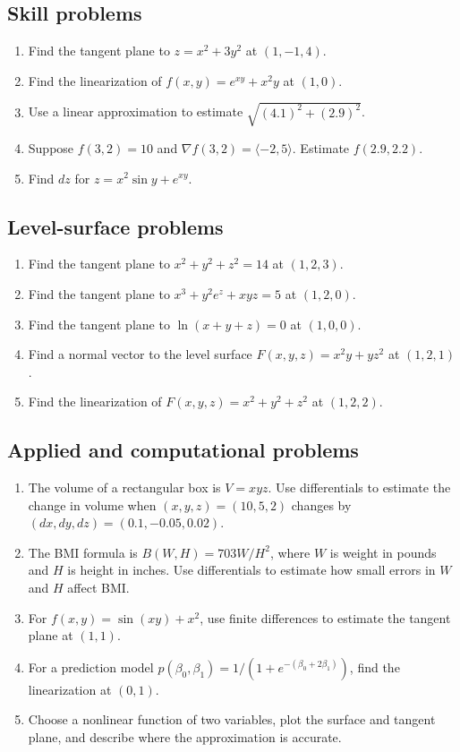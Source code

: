 \documentclass[11pt]{article}
\newcommand{\grad}{\nabla}
\begin{document}
\subsection*{Skill problems}
\begin{enumerate}[start=6]
  \item Find the tangent plane to $z=x^2+3y^2$ at $(1,-1,4)$.
  \item Find the linearization of $f(x,y)=e^{xy}+x^2y$ at $(1,0)$.
  \item Use a linear approximation to estimate $\sqrt{(4.1)^2+(2.9)^2}$.
  \item Suppose $f(3,2)=10$ and $\grad f(3,2)=\langle -2,5\rangle$. Estimate $f(2.9,2.2)$.
  \item Find $dz$ for $z=x^2\sin y+e^{xy}$.
\end{enumerate}

\subsection*{Level-surface problems}
\begin{enumerate}[start=11]
  \item Find the tangent plane to $x^2+y^2+z^2=14$ at $(1,2,3)$.
  \item Find the tangent plane to $x^3+y^2e^z+xyz=5$ at $(1,2,0)$.
  \item Find the tangent plane to $\ln(x+y+z)=0$ at $(1,0,0)$.
  \item Find a normal vector to the level surface $F(x,y,z)=x^2y+yz^2$ at $(1,2,1)$.
  \item Find the linearization of $F(x,y,z)=x^2+y^2+z^2$ at $(1,2,2)$.
\end{enumerate}

\subsection*{Applied and computational problems}
\begin{enumerate}[start=16]
  \item The volume of a rectangular box is $V=xyz$. Use differentials to estimate the change in volume when $(x,y,z)=(10,5,2)$ changes by $(dx,dy,dz)=(0.1,-0.05,0.02)$.
  \item The BMI formula is $B(W,H)=703W/H^2$, where $W$ is weight in pounds and $H$ is height in inches. Use differentials to estimate how small errors in $W$ and $H$ affect BMI.
  \item For $f(x,y)=\sin(xy)+x^2$, use finite differences to estimate the tangent plane at $(1,1)$.
  \item For a prediction model $p(\beta_0,\beta_1)=1/(1+e^{-(\beta_0+2\beta_1)})$, find the linearization at $(0,1)$.
  \item Choose a nonlinear function of two variables, plot the surface and tangent plane, and describe where the approximation is accurate.
\end{enumerate}
\end{document}
